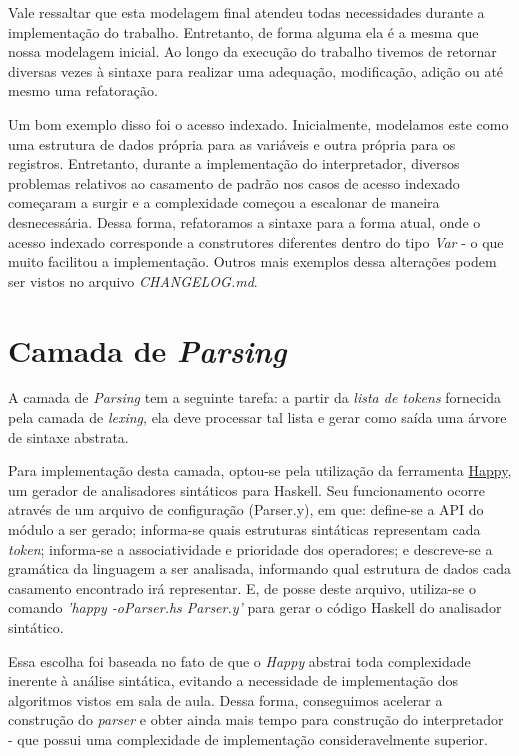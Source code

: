 \documentclass{article}
\begin{document}
Vale ressaltar que esta modelagem final atendeu todas necessidades durante a implementação do trabalho. Entretanto, de forma alguma ela é a mesma que nossa modelagem inicial. Ao longo da execução do trabalho tivemos de retornar diversas vezes à sintaxe para realizar uma adequação, modificação, adição ou até mesmo uma refatoração. 

Um bom exemplo disso foi o acesso indexado. Inicialmente, modelamos este como uma estrutura de dados própria para as variáveis e outra própria para os registros. Entretanto, durante a implementação do interpretador, diversos problemas relativos ao casamento de padrão nos casos de acesso indexado começaram a surgir e a complexidade começou a escalonar de maneira desnecessária. Dessa forma, refatoramos a sintaxe para a forma atual, onde o acesso indexado corresponde a construtores diferentes dentro do tipo \textit{Var} - o que muito facilitou a implementação. Outros mais exemplos dessa alterações podem ser vistos no arquivo \textit{CHANGELOG.md}.

\section{Camada de \textit{Parsing}}
A camada de \textit{Parsing} tem a seguinte tarefa: a partir da \textit{lista de tokens} fornecida pela camada de \textit{lexing}, ela deve processar tal lista e gerar como saída uma árvore de sintaxe abstrata. 

Para implementação desta camada, optou-se pela utilização da ferramenta \href{https://haskell-happy.readthedocs.io/en/latest/}{Happy}, um gerador de analisadores sintáticos para Haskell. Seu funcionamento ocorre através de um arquivo de configuração (Parser.y), em que: define-se a API do módulo a ser gerado; informa-se quais estruturas sintáticas representam cada \textit{token}; informa-se a associatividade e prioridade dos operadores; e descreve-se a gramática da linguagem a ser analisada, informando qual estrutura de dados cada casamento encontrado irá representar. E, de posse deste arquivo, utiliza-se o comando \textit{'happy -oParser.hs Parser.y'} para gerar o código Haskell do analisador sintático.

Essa escolha foi baseada no fato de que o \textit{Happy} abstrai toda complexidade inerente à análise sintática, evitando a necessidade de implementação dos algoritmos vistos em sala de aula. Dessa forma, conseguimos acelerar a construção do \textit{parser} e obter ainda mais tempo para construção do interpretador - que possui uma complexidade de implementação consideravelmente superior.
\end{document}
